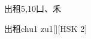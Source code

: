 \begin{entry}{出租}{5,10}{⼐、⽲}
  \begin{phonetics}{出租}{chu1 zu1}[][HSK 2]
  \end{phonetics}
\end{entry}

